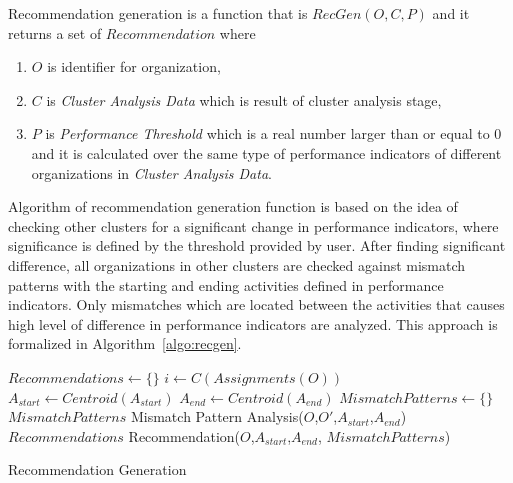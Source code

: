 \theoremstyle{definition}
\begin{definition}
Recommendation generation is a function that is $RecGen(O, C, P)$ and it returns a set of $Recommendation$ where
  \begin{enumerate}
    \item $O$ is identifier for organization,
    \item $C$ is \textit{Cluster Analysis Data} which is result of cluster analysis stage,
    \item $P$ is \textit{Performance Threshold} which is a real number larger than or equal to 0 and it is calculated over the same type of performance indicators of different organizations in \textit{Cluster Analysis Data}.
  \end{enumerate}
\end{definition}

Algorithm of recommendation generation function is based on the idea of checking other clusters for a significant change in performance indicators, where significance is defined by the threshold provided by user. After finding significant difference, all organizations in other clusters are checked against mismatch patterns with the starting and ending activities defined in performance indicators. Only mismatches which are located between the activities that causes high level of difference in performance indicators are analyzed. This approach is formalized in Algorithm~\ref{algo:recgen}.
 \begin{algorithm}
\DontPrintSemicolon %
$Recommendations \leftarrow \{\}$ \;
$i \leftarrow C(Assignments(O))$ \;
 { 
   { 
     {
       {
        $A_{start} \leftarrow Centroid(A_{start})$ \;
        $A_{end} \leftarrow Centroid(A_{end})$ \;
        $MismatchPatterns \leftarrow \{\}$ \;
         {
          $MismatchPatterns$ \leftarrow  Mismatch Pattern Analysis($O$,$O'$,$A_{start}$,$A_{end}$) \;
        }
        $Recommendations$ \leftarrow  Recommendation($O$,$A_{start}$,$A_{end}$, $MismatchPatterns$) \;
      }
    }
  }
}
 \;
\caption{Recommendation Generation}
\label{algo:recgen}
\end{algorithm}

